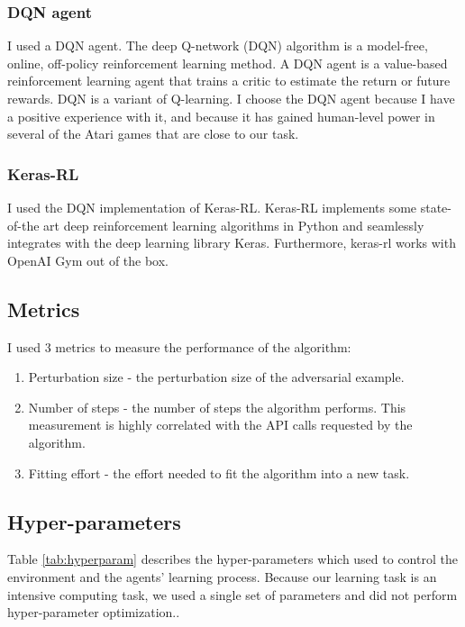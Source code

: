 \documentclass{article}
\begin{document}
\subsubsection{DQN agent}
I used a DQN agent. The deep Q-network (DQN) algorithm is a model-free, online, off-policy reinforcement learning method. A DQN agent is a value-based reinforcement learning agent that trains a critic to estimate the return or future rewards. DQN is a variant of Q-learning. I choose the DQN agent because I have a positive experience with it, and because it has gained human-level power in several of the Atari games that are close to our task.

\subsubsection{Keras-RL}
I used the DQN implementation of Keras-RL. Keras-RL \cite{plappert2016kerasrl} implements some state-of-the art deep reinforcement learning algorithms in Python and seamlessly integrates with the deep learning library Keras. Furthermore, keras-rl works with OpenAI Gym out of the box. 

\subsection{Metrics}
I used 3 metrics to measure the performance of the algorithm: 

\begin{enumerate}
\item Perturbation size - the perturbation size of the adversarial example. 
\item Number of steps - the number of steps the algorithm performs. This measurement is highly correlated with the API calls requested by the algorithm. 
\item Fitting effort - the effort needed to fit the algorithm into a new task.
\end{enumerate}

\subsection{Hyper-parameters}
Table \ref{tab:hyperparam} describes the hyper-parameters which used to control the environment and the agents' learning process.
Because our learning task is an intensive computing task, we used a single set of parameters and did not perform hyper-parameter optimization..
\end{document}
